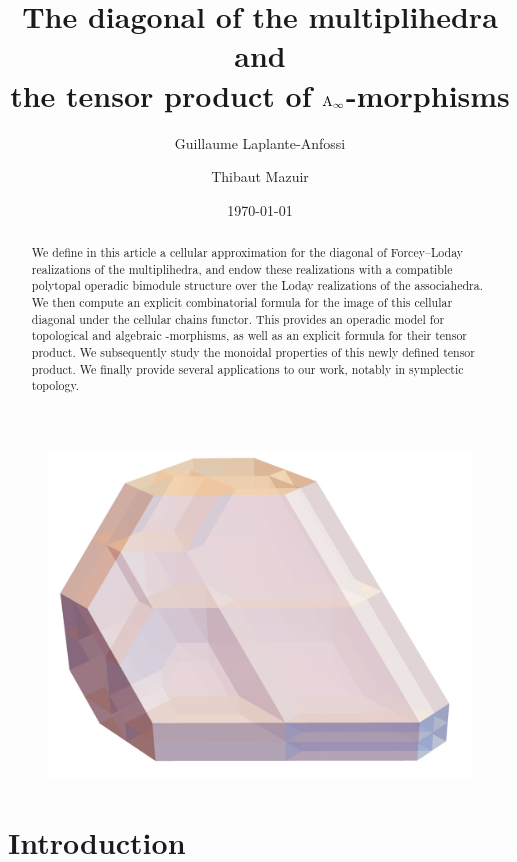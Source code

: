 \documentclass[twoside, 11pt]{amsart}
\title[The diagonal of the multiplihedra]{The diagonal of the multiplihedra and \\ the tensor product of $\mathrm{A}_\infty$-morphisms}
\author{Guillaume Laplante-Anfossi}
\author{Thibaut Mazuir}
\date{\today}
\theoremstyle{remark}
\begin{document}
\begin{abstract}
We define in this article a cellular approximation for the diagonal of Forcey--Loday realizations of the multiplihedra, and endow these realizations with a compatible polytopal operadic bimodule structure over the Loday realizations of the associahedra. 
We then compute an explicit combinatorial formula for the image of this cellular diagonal under the cellular chains functor.
This provides an operadic model for topological and algebraic \Ainf -morphisms, as well as an explicit formula for their tensor product. We subsequently study the monoidal properties of this newly defined tensor product. We finally provide several applications to our work, notably in symplectic topology.
\end{abstract}

\maketitle

\begin{figure}[h!]
\centering
\includegraphics[width=0.6\linewidth]{J4.png} 
\label{Fig5:J4}
\end{figure}

\newpage

\setcounter{tocdepth}{1}
\tableofcontents


\section*{Introduction}

\end{document}

